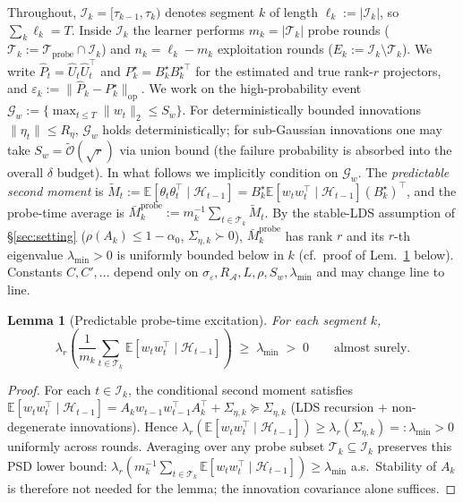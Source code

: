 \documentclass{article}
\newcommand{\E}{\mathbb{E}}
\newcommand{\op}{\mathrm{op}}
\newcommand{\cA}{\mathcal{A}}
\newcommand{\cH}{\mathcal{H}}
\newcommand{\cT}{\mathcal{T}}
\newcommand{\cI}{\mathcal{I}}
\newcommand{\cTprobe}{\mathcal{T}_{\mathrm{probe}}}
\newcommand{\tilO}{\widetilde{\mathcal{O}}}
\newtheorem{lemma}{Lemma}
\begin{document}
Throughout, $\cI_k = [\tau_{k-1}, \tau_k)$ denotes segment $k$ of
length $\ell_k := |\cI_k|$, so $\sum_k \ell_k = T$. Inside $\cI_k$ the
learner performs $m_k = |\cT_k|$ probe rounds ($\cT_k := \cTprobe\cap\cI_k$)
and $n_k = \ell_k - m_k$ exploitation rounds ($E_k := \cI_k\setminus\cT_k$).
We write $\widehat P_t = \widehat U_t \widehat U_t^\top$ and
$P_k^\star = B_k^\star B_k^{\star\top}$ for the estimated and true rank-$r$
projectors, and $\varepsilon_k := \|\widehat P_k - P_k^\star\|_{\op}$.
We work on the high-probability event
$\mathcal G_w := \bigl\{\max_{t\le T}\|w_t\|_2\le S_w\bigr\}$. For
deterministically bounded innovations $\|\eta_t\|\le R_\eta$,
$\mathcal G_w$ holds deterministically; for sub-Gaussian innovations
one may take $S_w = \tilO(\sqrt r)$ via union bound (the failure
probability is absorbed into the overall $\delta$ budget). In what
follows we implicitly condition on $\mathcal G_w$.
The \emph{predictable second moment} is
$\widetilde M_t := \E[\theta_t\theta_t^\top\mid\cH_{t-1}]
= B_k^\star \E[w_tw_t^\top\mid\cH_{t-1}](B_k^\star)^\top$, and the
probe-time average is
$\bar M_k^{\mathrm{probe}} := m_k^{-1}\sum_{t\in\cT_k}\widetilde M_t$.
By the stable-LDS assumption of \S\ref{sec:setting}
($\rho(A_k)\le 1-\alpha_0$, $\Sigma_{\eta,k}\succ 0$), $\bar M_k^{\mathrm{probe}}$ has rank $r$
and its $r$-th eigenvalue $\lambda_{\min}>0$ is uniformly bounded
below in $k$ (cf.\ proof of
Lem.~\ref{lem:probe_excitation_conf} below).
Constants $C,C',\ldots$ depend only on
$\sigma_\varepsilon, R_\cA, L, \rho, S_w, \lambda_{\min}$ and may
change line to line.

\begin{lemma}[Predictable probe-time excitation]
\label{lem:probe_excitation_conf}
For each segment $k$,
\[
\lambda_r\!\left(\frac{1}{m_k}\sum_{t\in\cT_k}\E[w_tw_t^\top\mid\cH_{t-1}]\right)
\;\ge\; \lambda_{\min}\;>\;0
\qquad\text{almost surely.}
\]
\end{lemma}
\begin{proof}
For each $t\in\cI_k$, the conditional second moment satisfies
$\E[w_t w_t^\top\mid\cH_{t-1}]
= A_k w_{t-1}w_{t-1}^\top A_k^\top + \Sigma_{\eta,k}
\succeq \Sigma_{\eta,k}$
(LDS recursion + non-degenerate innovations). Hence
$\lambda_r(\E[w_tw_t^\top\mid\cH_{t-1}]) \ge \lambda_r(\Sigma_{\eta,k}) =: \lambda_{\min} > 0$
uniformly across rounds. Averaging over any probe subset
$\cT_k\subseteq\cI_k$ preserves this PSD lower bound:
$\lambda_r(m_k^{-1}\sum_{t\in\cT_k}\E[w_tw_t^\top\mid\cH_{t-1}])\ge\lambda_{\min}$
a.s.\ Stability of $A_k$ is therefore not needed for the lemma; the
innovation covariance alone suffices.
\end{proof}
\end{document}
